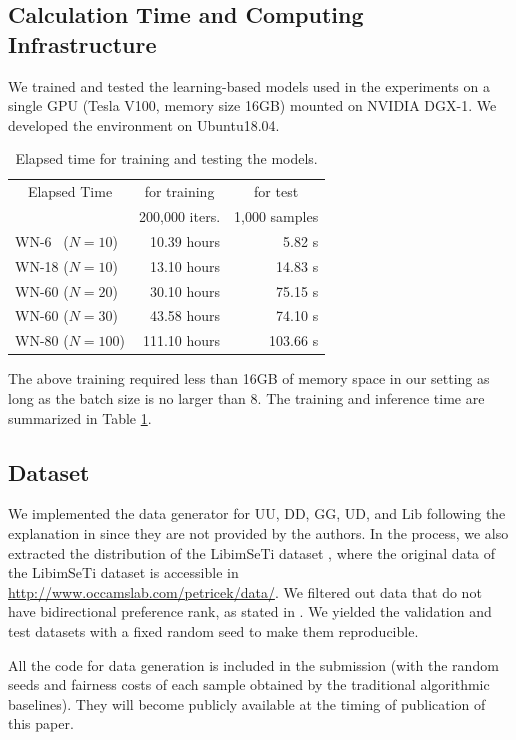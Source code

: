 \subsection{Calculation Time and Computing Infrastructure}
We trained and tested the learning-based models used in the experiments on a single GPU (Tesla V100, memory size 16GB) mounted on NVIDIA DGX-1. We developed the environment on Ubuntu18.04. %
\begin{table}
    \centering
  {\small
    \begin{tabular}{lrr}
    \toprule
        \multicolumn{1}{c}{Elapsed Time} & \multicolumn{1}{c}{for training}  & \multicolumn{1}{c}{for test} \\
        & 200,000 iters. & 1,000 samples \\
        \midrule
        WN-6~ ($N=10$)  & 10.39 hours & 5.82 s \\ 
        WN-18 ($N=10$) & 13.10 hours & 14.83 s \\ 
        WN-60 ($N=20$) & 30.10 hours & 75.15 s \\
        WN-60 ($N=30$) & 43.58 hours & 74.10 s \\ 
        WN-80 ($N=100$) & 111.10 hours & 103.66 s \\ 
    \end{tabular}
    }
    \caption{Elapsed time for training and testing the models.}
    \label{tab:elapsed_time}
\end{table} 

The above training required less than 16GB of memory space in our setting as long as the batch size is no larger than $8$.
The training and inference time are summarized in Table \ref{tab:elapsed_time}.

\subsection{Dataset}
We implemented the data generator for UU, DD, GG, UD, and Lib following the explanation in \cite{tziavelis2019equitable} since they are not provided by the authors. 
In the process, we also extracted the distribution of the LibimSeTi dataset \cite{brozovsky07recommender}, where the original data of the LibimSeTi dataset is accessible in \url{http://www.occamslab.com/petricek/data/}. 
We filtered out data that do not have bidirectional preference rank, as stated in \cite{tziavelis2019equitable}.
We yielded the validation and test datasets with a fixed random seed to make them reproducible. 

All the code for data generation is included in the submission (with the random seeds and fairness costs of each sample obtained by the traditional algorithmic baselines).  They will become publicly available at the timing of publication of this paper. 

